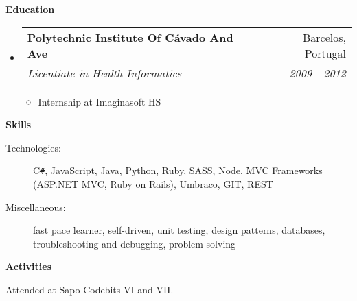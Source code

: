 \documentclass[letterpaper,11pt]{article}
\makeatletter
\newcommand{\resitem}[1]{\item #1 \vspace{-2pt}}
\newcommand{\resheading}[1]{{\large \colorbox{mygrey}{\begin{minipage}{\textwidth}{\textbf{#1 \vphantom{p\^{E}}}}\end{minipage}}}}
\newcommand{\ressubheading}[4]{
\begin{tabular*}{7.0in}{l@{\extracolsep{\fill}}r}
		\textbf{#1} & #2 \\
		\textit{#3} & \textit{#4} \\
\end{tabular*}\vspace{-6pt}}
\makeatother
\begin{document}
\resheading{Education}
\begin{itemize}
	\item
	\ressubheading{Polytechnic Institute Of C\'avado And Ave}{Barcelos, Portugal}{Licentiate in Health Informatics}{2009 - 2012}
	\begin{itemize}
		\resitem{Internship at Imaginasoft HS}
	\end{itemize}
	
\end{itemize}


\resheading{Skills}

\begin{description}
\item[Technologies:]
C{}\verb!#!, JavaScript, Java, Python, Ruby, SASS, Node, MVC Frameworks (ASP.NET MVC, Ruby on Rails), Umbraco, GIT, REST
\item[Miscellaneous:]
fast pace learner, self-driven, unit testing, design patterns, databases, troubleshooting and debugging, problem solving
\end{description}	

\resheading{Activities}

\begin{description}
\item[Attended at Sapo Codebits VI and VII.]
\end{description}
\end{document}
